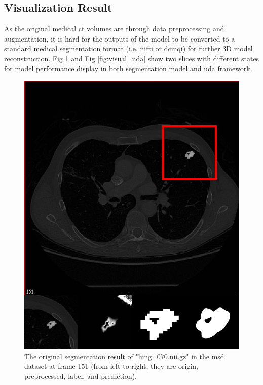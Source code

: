\documentclass[11pt,times,oneside,openright]{eeereport}
\begin{document}
\subsection{Visualization Result}
As the original medical \acrshort{ct} volumes are through data preprocessing and augmentation, it is hard for the outputs of the model to be converted to a standard medical segmentation format (i.e. \acrshort{nifti} or \acrshort{dcmqi}) for further 3D model reconstruction. Fig \ref{fig:visual_seg} and Fig \ref{fig:visual_uda} show two slices with different states for model performance display in both segmentation model and \acrshort{uda} framework.

\begin{figure}[!htb]
   \begin{minipage}{0.48\textwidth}
     \centering
     \includegraphics[width=.9\linewidth]{fig/result/visual_seg.png}
     \caption{The original segmentation result of "lung\_070.nii.gz" in the \acrshort{msd} dataset at frame 151 (from left to right, they are origin, preprocessed, label, and prediction).}\label{fig:visual_seg}
   \end{minipage}\hfill
   \begin{minipage}{0.48\textwidth}

\end{minipage}
\end{figure}
\end{document}
